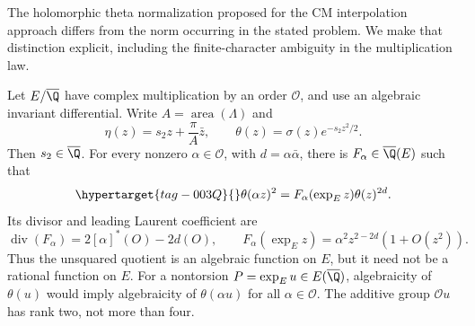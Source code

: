 The holomorphic theta normalization proposed for the CM interpolation approach differs from the
norm occurring in the stated problem. We make that distinction explicit,
including the finite-character ambiguity in the multiplication law.

\begin{proposition}\hypertarget{tag-001F}{}\label{ari:C.7.6}

Let $E/\overline{\Q}$ have complex multiplication by an order
$\mathcal O$, and use an algebraic invariant differential. Write
$A=\operatorname{area}(\Lambda)$ and
\[
 \eta(z)=s_2z+\frac{\pi}{A}\bar z,\qquad
 \theta(z)=\sigma(z)e^{-s_2z^2/2}.
\]
Then $s_2\in\overline{\Q}$. For every nonzero
$\alpha\in\mathcal O$, with $d=\alpha\bar\alpha$, there is
$F_\alpha\in\overline{\Q}(E)$ such that
\begin{equation}\hypertarget{tag-003Q}{}\label{ari:eq:ct-CMmult}
 \theta(\alpha z)^2=F_\alpha(\exp_E z)\theta(z)^{2d}.
\end{equation}
Its divisor and leading Laurent coefficient are
\[
 \operatorname{div}(F_\alpha)=2[\alpha]^*(O)-2d(O),\qquad
 F_\alpha(\exp_Ez)=\alpha^2z^{2-2d}(1+O(z^2)).
\]
Thus the unsquared quotient is an algebraic function on $E$, but
it need not be a rational function on $E$. For a nontorsion
$P=\exp_Eu\in E(\overline{\Q})$, algebraicity of $\theta(u)$
would imply algebraicity of $\theta(\alpha u)$ for all
$\alpha\in\mathcal O$. The additive group $\mathcal O u$ has
rank two, not more than four.
\end{proposition}


